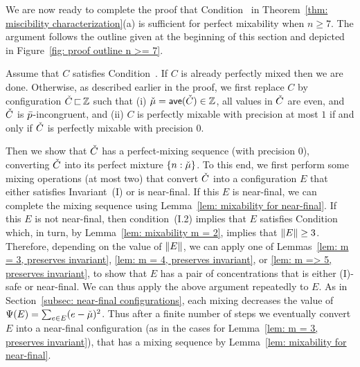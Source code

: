 
We are now ready to complete the proof that Condition~{\MixCond} in 
Theorem~\ref{thm: miscibility characterization}(a) is sufficient 
for perfect mixability when $n\geq 7$. The argument follows
the outline given at the beginning of this section and depicted in
Figure~\ref{fig: proof outline n >= 7}.

Assume that $C$ satisfies Condition~{\MixCond}. 
If $C$ is already perfectly mixed then we are done.
Otherwise, as described earlier in the proof, 
we first replace $C$ by configuration ${\check{C}} {\,\sqsubset\,}{\mathbb Z}$
such that (i) ${\check{\mu}} = {\textsf{ave}}({\check{C}})\in{\mathbb Z}$,
all values in ${\check{C}}$ are even, and ${\check{C}}$ is ${\bar{p}}$-incongruent,
and (ii) $C$ is perfectly mixable with precision at most $1$ if and only if 
${\check{C}}$ is perfectly mixable with precision $0$. 

Then we show that ${\check{C}}$ has a perfect-mixing sequence (with precision $0$), converting
${\check{C}}$ into its perfect mixture ${ \left\{ n:{\check{\mu}} \right\} }$.
To this end, we first perform some mixing operations (at most two)
that convert ${\check{C}}$ into a configuration $E$
that either satisfies Invariant~(I) or is near-final.
If this $E$ is near-final, we can complete the mixing
sequence using Lemma~\ref{lem: mixability for near-final}.
If this $E$ is not near-final, then condition~(I.2) implies that $E$ satisfies Condition~{\MixCond}
which, in turn, by Lemma~\ref{lem: mixability m = 2}, implies that ${\|E\|}\ge 3$.
Therefore, depending on the value of ${\|E\|}$, we can apply
one of Lemmas~\ref{lem: m = 3, preserves invariant}, \ref{lem: m = 4, preserves invariant},
or \ref{lem: m => 5, preserves invariant}, 
to show that $E$ has a pair of concentrations that is either (I)-safe or near-final.
We can thus apply the above argument repeatedly to $E$.
As in Section~\ref{subsec: near-final configurations}, 
each mixing decreases the value of ${\Psi}(E) = \sum_{e\in E}(e - {\check{\mu}})^2$.
Thus after a finite number of steps
we eventually convert $E$ into a near-final configuration
(as in the cases for Lemma~\ref{lem: m = 3, preserves invariant}), 
that has a mixing sequence by Lemma~\ref{lem: mixability for near-final}.

 







